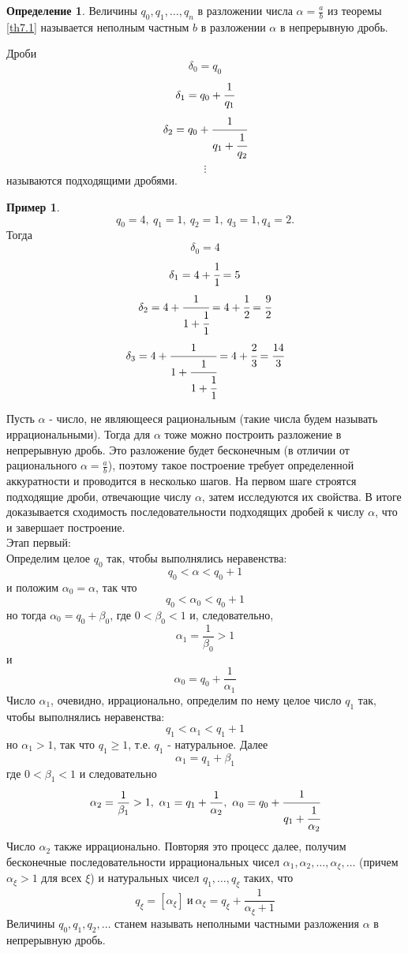 \documentclass[a4paper, 12pt]{article}
\theoremstyle{definition}
\newtheorem{definition}{Определение}[section]
\newtheorem*{example}{Пример}
\begin{document}
    \begin{definition}
        Величины $q_0, q_1, \dots, q_n$ в разложении числа $\alpha=\frac{a}{b}$ из теоремы \ref{th7.1} называется неполным частным $b$ в разложении $\alpha$ в непрерывную дробь.
    \end{definition} 
        Дроби \[\delta_0=q_0\]
        \[\delta_1=q_0+\cfrac{1}{q_1}\] 
        \[\delta_2=q_0+\cfrac{1}{q_1+\cfrac{1}{q_2}}\]
        \[\vdots\]
    называются подходящими дробями.
    \begin{example}
    \[q_0=4,\ q_1=1,\ q_2=1,\ q_3=1, q_4=2.\]
    Тогда
    \[\delta_0=4\]
    \[\delta_1=4+\cfrac{1}{1}=5\]
    \[\delta_2=4+\cfrac{1}{1+\cfrac{1}{1}}=4+\cfrac{1}{2}=\cfrac{9}{2}\]
    \[\delta_3=4+\cfrac{1}{1+\cfrac{1}{1+\cfrac{1}{1}}}=4+\cfrac{2}{3}=\cfrac{14}{3}\]
    \end{example}
    Пусть $\alpha$ - число, не являющееся рациональным (такие числа будем называть иррациональными). Тогда для $\alpha$ тоже можно построить разложение в непрерывную дробь. Это разложение будет бесконечным (в отличии от рационального $\alpha=\frac{a}{b}$), поэтому такое построение требует определенной аккуратности и проводится в несколько шагов. На первом шаге строятся подходящие дроби, отвечающие числу $\alpha$, затем исследуются их свойства. В итоге доказывается сходимость последовательности подходящих дробей к числу $\alpha$, что и завершает построение.\\
    Этап первый:\\
    Определим целое $q_0$ так, чтобы выполнялись неравенства: \[q_0<\alpha<q_0+1\] и положим $\alpha_0=\alpha$, так что \[q_0<\alpha_0<q_0+1\] но тогда $\alpha_0=q_0+\beta_0$, где $0<\beta_0<1$ и, следовательно, \[\alpha_1=\frac{1}{\beta_0}>1\] и \[\alpha_0=q_0+\frac{1}{\alpha_1}\] Число $\alpha_1$, очевидно, иррационально, определим по нему целое число $q_1$ так, чтобы выполнялись неравенства: \[q_1<\alpha_1<q_1+1\] но $\alpha_1>1$, так что $q_1\geq 1$, т.е. $q_1$ - натуральное. Далее \[\alpha_1=q_1+\beta_1\] где $0<\beta_1<1$ и следовательно \[\alpha_2=\frac{1}{\beta_1}>1,\ \alpha_1=q_1+\frac{1}{\alpha_2},\ \alpha_0=q_0+\cfrac{1}{q_1+\cfrac{1}{\alpha_2}}\] Число $\alpha_2$ также иррационально. Повторяя это процесс далее, получим бесконечные последовательности иррациональных чисел $\alpha_1, \alpha_2,\dots, \alpha_{\xi},\dots$ (причем $\alpha_{\xi}>1$ для всех $\xi$) и натуральных чисел $q_1,\dots, q_{\xi}$ таких, что \[q_{\xi}=[\alpha_{\xi}]\ \text{и} \ \alpha_{\xi}=q_{\xi}+\frac{1}{\alpha_{\xi}+1}\] 
    Величины $q_0,q_1,q_2,\dots$ станем называть неполными частными разложения $\alpha$ в непрерывную дробь.
\end{document}
